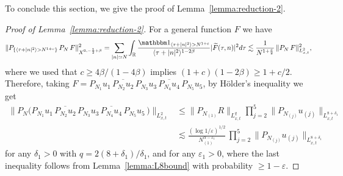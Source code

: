 \documentclass[11pt, xcolor = dvipsnames,reqno
]{amsart}
\theoremstyle{definition}
\theoremstyle{remark}
\begin{document}
To conclude this section, we give the proof of Lemma~\ref{lemma:reduction-2}. 
\begin{proof}[Proof of Lemma~\ref{lemma:reduction-2}]
For a general function $F$ we have 
\begin{align}
    \lVert 
    P_{\left\{ \langle \tau + |n|^2 \rangle > N^{1+c} \right\}} \, 
    P_N \, 
    F
    \rVert_{X^{0,-\frac12 + \beta}}^2
     = 
    \sum_{|n| \simeq N} \int_{\mathbb{R}} \frac{\mathbbm 1_{\langle \tau + |n|^2 \rangle > N^{1+c}}}{\langle \tau + |n|^2 \rangle^{1 - 2\beta}} |
    \widetilde F(\tau,n)|^2 d\tau 
    \lesssim \frac{1}{N^{1 + \frac{c}{2}}}\, 
    \lVert 
    P_N \, F
    \rVert_{L^2_{x,t}}^2,
\end{align}
where we used that $c \geq 4\beta/(1 - 4\beta)$ implies $(1+c)(1 - 2\beta) \geq 1 + c/2$. Therefore, taking $F = P_{N_1}u_1 \, 
    \overline{P_{N_2} u_2} \, 
    P_{N_3}u_3 \, 
    \overline{P_{N_4}u_4} \,
    P_{N_5} u_5$, 
by H\"older's inequality we get
\begin{align}
    \big\|
    P_N 
    \big(
    P_{N_1}u_1 \, 
    \overline{P_{N_2} u_2} \, 
    P_{N_3}u_3 \, 
    \overline{P_{N_4}u_4} \, 
    P_{N_5}u_5 \, 
    \big) \big\|_{L^2_{x,t}} 
    & \leq 
    \| P_{N_{(1)}} R \|_{L^q_{x,t}} 
    \prod_{j=2}^5 
    \|
    P_{N_{(j)}} u_{(j)} 
    \|_{L^{8 + \delta_1}_{x,t}} \\
    & \lesssim 
    \frac{( \log 1/\varepsilon )^{1/2}}{N_{(1)}^{\alpha - \varepsilon_1}} \, 
    \prod_{j=2}^5 
    \|
    P_{N_{(j)}} u_{(j)} 
    \|_{L^{8 + \delta_1}_{x,t}}
\end{align}
for any $\delta_1 > 0$ with $q = 2(8+\delta_1)/\delta_1$, 
and for any $\varepsilon_1 > 0$, 
where the last inequality follows from Lemma~\ref{lemma:L8bound}
with probability $\geq 1 - \varepsilon$.


\end{proof}
\end{document}
